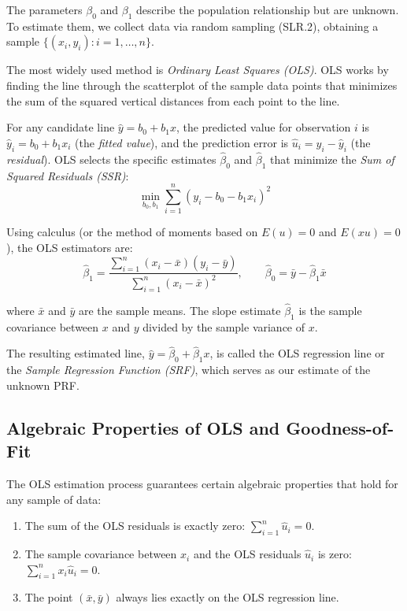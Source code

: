 The parameters $\beta_0$ and $\beta_1$ describe the population relationship but are unknown. To estimate them, we collect data via random sampling (SLR.2), obtaining a sample $\{(x_i, y_i): i = 1, \ldots, n\}$.

The most widely used method is \emph{Ordinary Least Squares (OLS)}. OLS works by finding the line through the scatterplot of the sample data points that minimizes the sum of the squared vertical distances from each point to the line.

For any candidate line $\hat{y} = b_0 + b_1 x$, the predicted value for observation $i$ is $\hat{y}_i = b_0 + b_1 x_i$ (the \emph{fitted value}), and the prediction error is $\hat{u}_i = y_i - \hat{y}_i$ (the \emph{residual}). OLS selects the specific estimates $\hat{\beta}_0$ and $\hat{\beta}_1$ that minimize the \emph{Sum of Squared Residuals (SSR)}:
$$\min_{b_0, b_1} \sum_{i=1}^{n} (y_i - b_0 - b_1 x_i)^2$$

Using calculus (or the method of moments based on $E(u) = 0$ and $E(xu) = 0$), the OLS estimators are:
$$\hat{\beta}_1 = \frac{\sum_{i=1}^{n}(x_i - \bar{x})(y_i - \bar{y})}{\sum_{i=1}^{n}(x_i - \bar{x})^2}, \qquad \hat{\beta}_0 = \bar{y} - \hat{\beta}_1 \bar{x}$$

where $\bar{x}$ and $\bar{y}$ are the sample means. The slope estimate $\hat{\beta}_1$ is the sample covariance between $x$ and $y$ divided by the sample variance of $x$.

The resulting estimated line, $\hat{y} = \hat{\beta}_0 + \hat{\beta}_1 x$, is called the OLS regression line or the \emph{Sample Regression Function (SRF)}, which serves as our estimate of the unknown PRF.
\subsection{Algebraic Properties of OLS and Goodness-of-Fit}

The OLS estimation process guarantees certain algebraic properties that hold for any sample of data:
\begin{enumerate}
  \item The sum of the OLS residuals is exactly zero: $\sum_{i=1}^{n} \hat{u}_i = 0$.
  \item The sample covariance between $x_i$ and the OLS residuals $\hat{u}_i$ is zero: $\sum_{i=1}^{n} x_i \hat{u}_i = 0$.
  \item The point $(\bar{x}, \bar{y})$ always lies exactly on the OLS regression line.
\end{enumerate}

